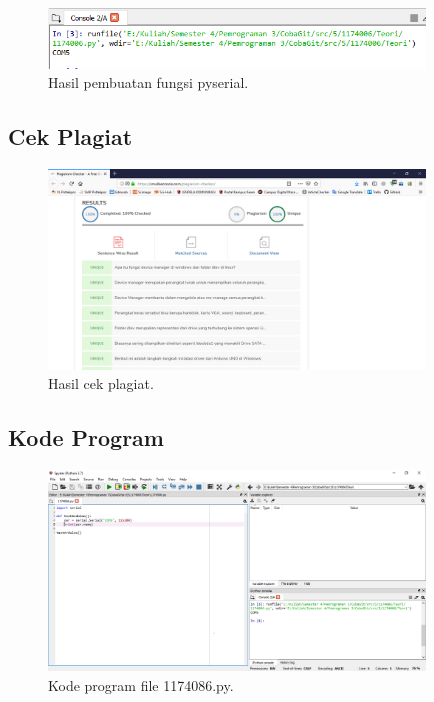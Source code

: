 

\begin{figure}[H]
	\includegraphics[width=10cm]{figures/5/1174086/Teori/hasil.png}
	\centering
	\caption{Hasil pembuatan fungsi pyserial.}
\end{figure}

\subsection{Cek Plagiat}
\begin{figure}[H]
	\includegraphics[width=10cm]{figures/5/1174086/Teori/plagiat.png}
	\centering
	\caption{Hasil cek plagiat.}
\end{figure}

\subsection{Kode Program}
\begin{figure}[H]
	\includegraphics[width=10cm]{figures/5/1174086/Teori/kodeprogram.png}
	\centering
	\caption{Kode program file 1174086.py.}
\end{figure}

